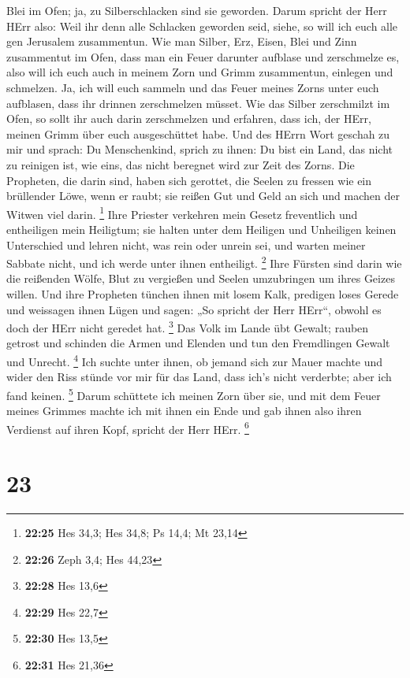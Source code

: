 Blei im Ofen; ja, zu Silberschlacken sind sie geworden. 
Darum spricht der Herr HErr also: Weil ihr denn alle Schlacken geworden
seid, siehe, so will ich euch alle gen Jerusalem zusammentun.
 Wie man Silber, Erz, Eisen, Blei und Zinn zusammentut im
Ofen, dass man ein Feuer darunter aufblase und zerschmelze es, also will
ich euch auch in meinem Zorn und Grimm zusammentun, einlegen und
schmelzen.  Ja, ich will euch sammeln und das Feuer
meines Zorns unter euch aufblasen, dass ihr drinnen zerschmelzen müsset.
 Wie das Silber zerschmilzt im Ofen, so sollt ihr auch
darin zerschmelzen und erfahren, dass ich, der HErr, meinen Grimm über
euch ausgeschüttet habe.  Und des HErrn Wort geschah zu
mir und sprach:  Du Menschenkind, sprich zu ihnen: Du
bist ein Land, das nicht zu reinigen ist, wie eins, das nicht beregnet
wird zur Zeit des Zorns.  Die Propheten, die darin sind,
haben sich gerottet, die Seelen zu fressen wie ein brüllender Löwe, wenn
er raubt; sie reißen Gut und Geld an sich und machen der Witwen viel
darin. \footnote{\textbf{22:25} Hes 34,3; Hes 34,8; Ps 14,4; Mt 23,14}
 Ihre Priester verkehren mein Gesetz freventlich und
entheiligen mein Heiligtum; sie halten unter dem Heiligen und Unheiligen
keinen Unterschied und lehren nicht, was rein oder unrein sei, und
warten meiner Sabbate nicht, und ich werde unter ihnen entheiligt.
\footnote{\textbf{22:26} Zeph 3,4; Hes 44,23}  Ihre
Fürsten sind darin wie die reißenden Wölfe, Blut zu vergießen und Seelen
umzubringen um ihres Geizes willen.  Und ihre Propheten
tünchen ihnen mit losem Kalk, predigen loses Gerede und weissagen ihnen
Lügen und sagen: „So spricht der Herr HErr``, obwohl es doch der HErr
nicht geredet hat. \footnote{\textbf{22:28} Hes 13,6} 
Das Volk im Lande übt Gewalt; rauben getrost und schinden die Armen und
Elenden und tun den Fremdlingen Gewalt und Unrecht. \footnote{\textbf{22:29}
  Hes 22,7}  Ich suchte unter ihnen, ob jemand sich zur
Mauer machte und wider den Riss stünde vor mir für das Land, dass ich's
nicht verderbte; aber ich fand keinen. \footnote{\textbf{22:30} Hes 13,5}
 Darum schüttete ich meinen Zorn über sie, und mit dem
Feuer meines Grimmes machte ich mit ihnen ein Ende und gab ihnen also
ihren Verdienst auf ihren Kopf, spricht der Herr HErr. \footnote{\textbf{22:31}
  Hes 21,36}

\hypertarget{section-22}{%
\section{23}\label{section-22}}

